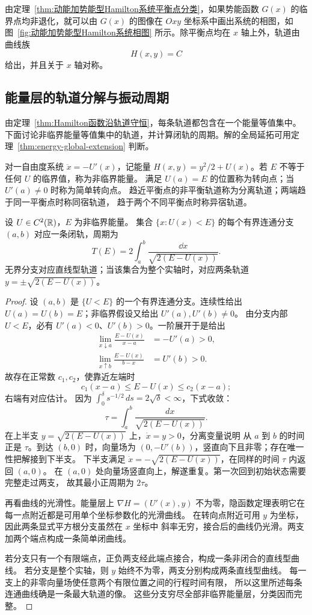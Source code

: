 由定理~\ref{thm:动能加势能型Hamilton系统平衡点分类}，如果势能函数 $G(x)$ 的临界点均非退化，就可以由 $G(x)$ 的图像在 $Oxy$ 坐标系中画出系统的相图，如图~\ref{fig:动能加势能型Hamilton系统相图} 所示。除平衡点均在 $x$ 轴上外，轨道由曲线族
\[
	H(x,y)=C
\]
给出，并且关于 $x$ 轴对称。



\subsection*{能量层的轨道分解与振动周期}
\label{sec:energy-levels}
由定理~\ref{thm:Hamilton函数沿轨道守恒}，每条轨道都包含在一个能量等值集中。下面讨论非临界能量等值集中的轨道，并计算闭轨的周期。解的全局延拓可用定理~\ref{thm:energy-global-extension} 判断。
\begin{definition}
对一自由度系统 $\ddot x=-U'(x)$，记能量
$H(x,y)=y^2/2+U(x)$。若 $E$ 不等于任何 $U$ 的临界值，称为非临界能量。
满足 $U(a)=E$ 的位置称为转向点；当 $U'(a)\ne0$ 时称为简单转向点。
趋近平衡点的非平衡轨道称为分离轨道；两端趋于同一平衡点时称同宿轨道，
趋于两个不同平衡点时称异宿轨道。
\end{definition}
\begin{theorem}[非临界能量层]\label{thm:regular-energy-level}
设 $U\in C^2(\mathbb{R})$，$E$ 为非临界能量。
集合 $\{x:U(x)<E\}$ 的每个有界连通分支 $(a,b)$ 对应一条闭轨，周期为
\[
 T(E)=2\int_a^b\frac{\dd x}{\sqrt{2(E-U(x))}}.
\]
无界分支对应直线型轨道；当该集合为整个实轴时，对应两条轨道
$y=\pm\sqrt{2(E-U(x))}$。
\end{theorem}
\begin{proof}
设 $(a,b)$ 是 $\{U<E\}$ 的一个有界连通分支。连续性给出
$U(a)=U(b)=E$；非临界假设又给出 $U'(a),U'(b)\ne0$。
由分支内部 $U<E$，必有 $U'(a)<0$、$U'(b)>0$。一阶展开于是给出
\[
 \begin{aligned}
 \lim_{x\downarrow a}\frac{E-U(x)}{x-a}&=-U'(a)>0,\\
 \lim_{x\uparrow b}\frac{E-U(x)}{b-x}&=U'(b)>0.
\end{aligned}
\]
故存在正常数 $c_1,c_2$，使靠近左端时
\[
 c_1(x-a)\leq E-U(x)\leq c_2(x-a);
\]
右端有对应估计。
因为 $\displaystyle\int_0^\delta s^{-1/2}\,ds=2\sqrt\delta<\infty$，下式收敛：
\[
 \tau=\int_a^b\frac{dx}{\sqrt{2(E-U(x))}}.
\]
在上半支 $y=\sqrt{2(E-U(x))}$ 上，$\dot x=y>0$，分离变量说明
从 $a$ 到 $b$ 的时间正是 $\tau$。到达 $(b,0)$ 时，向量场为
$(0,-U'(b))$，竖直向下且非零；存在唯一性把解接到下半支。
下半支满足 $\dot x=-\sqrt{2(E-U(x))}$，在同样的时间 $\tau$ 内返回 $(a,0)$。
在 $(a,0)$ 处向量场竖直向上，解遂重复。第一次回到初始状态需要完整走过两支，
故其最小正周期为 $2\tau$。

再看曲线的光滑性。能量层上
$\nabla H=(U'(x),y)$ 不为零，隐函数定理表明它在每一点附近都是可用单个坐标参数化的光滑曲线。
在转向点附近可用 $y$ 为坐标，因此两条显式平方根分支虽然在 $x$ 坐标中
斜率无穷，接合后的曲线仍光滑。两支加两个端点构成一条简单闭曲线。

若分支只有一个有限端点，正负两支经此端点接合，构成一条非闭合的直线型曲线。
若分支是整个实轴，则 $y$ 始终不为零，两支分别构成两条直线型曲线。
每一支上的非零向量场使任意两个有限位置之间的行程时间有限，
所以这里所述每条连通曲线确是一条最大轨道的像。
这些分支穷尽全部非临界能量层，分类因而完整。
\end{proof}
